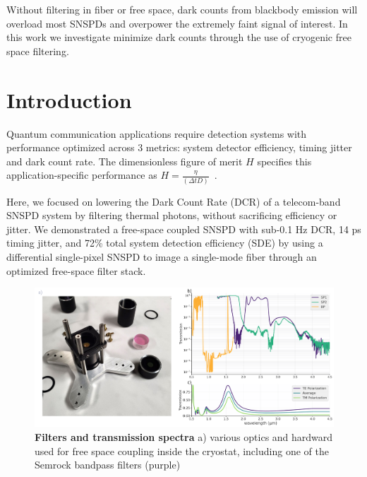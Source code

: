 \documentclass[11pt]{caltech_thesis} %
\begin{document}
Without filtering in fiber or free space, dark counts from blackbody emission will overload most SNSPDs and overpower the extremely faint signal of interest. In this work we investigate minimize dark counts through the use of cryogenic free space filtering.

\hypertarget{introduction-1}{%
\section{Introduction}\label{introduction-1}}

Quantum communication applications require detection systems with performance optimized across 3 metrics: system detector efficiency, timing jitter and dark count rate. The dimensionless figure of merit $H$ specifies this application-specific performance as $H = \frac{\eta}{(\Delta t D)}$~\autocite{Hadfield2009}.

Here, we focused on lowering the Dark Count Rate (DCR) of a telecom-band SNSPD system by filtering thermal photons, without sacrificing efficiency or jitter. We demonstrated a free-space coupled SNSPD with sub-0.1 Hz DCR, 14 ps timing jitter, and 72\% total system detection efficiency (SDE) by using a differential single-pixel SNSPD \autocite{Colangelo2021} to image a single-mode fiber through an optimized free-space filter stack.

\hypertarget{fig:dcrmin_filters}{%
\begin{figure}
\centering
\includegraphics[width=1\textwidth,height=\textheight]{./chapter_02/figs/dcrmin_filters_light.pdf}
\caption[{Filters and transmission spectra}]{\textbf{Filters and transmission spectra} a) various optics and hardward used for free space coupling inside the cryostat, including one of the Semrock bandpass filters (purple)}
\label{fig:dcrmin_filters}
\end{figure}
}
\end{document}
